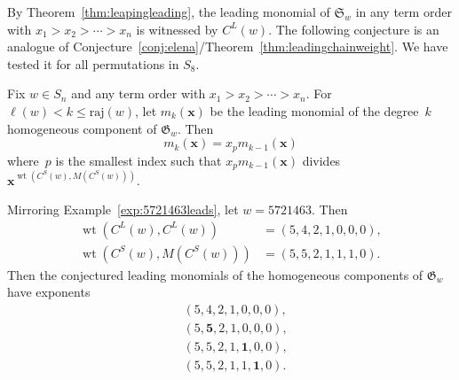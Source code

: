 \documentclass[ALCO]{cedram}
\newcommand{\absrajcode}[1]{\mathrm{raj}(#1)}
\DeclareMathOperator{\wt}{\mathrm{wt}}
\newcommand{\CL}{C^L}
\newcommand{\CS}{C^S}
\begin{document}
By Theorem~\ref{thm:leapingleading}, the leading monomial of $\mathfrak{S}_w$ in any term order with $x_1>x_2>\cdots>x_n$ is witnessed by $\CL(w)$. The following conjecture is an analogue of Conjecture~\ref{conj:elena}/Theorem~\ref{thm:leadingchainweight}. We have tested it for all permutations in $S_8$.
\begin{conjecture}
	\label{conj:reverseinterpolating}
	Fix $w\in S_n$ and any term order with $x_1>x_2>\cdots>x_n$. For $\ell(w)< k\leq \absrajcode{w}$, let $m_k(\bm{x})$ be the leading monomial of the degree~$k$ homogeneous component of $\mathfrak{G}_w$. Then
	\[m_k(\bm{x}) = x_pm_{k-1}(\bm{x}) \]
	where~$p$ is the smallest index such that $x_p m_{k-1}(\bm{x})$ divides $\bm{x}^{\wt(\CS(w),M(\CS(w)))}$.
\end{conjecture}

\begin{example}
	Mirroring Example~\ref{exp:5721463leads}, let $w=5721463$. Then
	\begin{align*}
		\wt(\CL(w),\CL(w)) &= (5, 4, 2, 1, 0, 0, 0),\\
		\wt(\CS(w),M(\CS(w))) &= (5, 5, 2, 1, 1, 1, 0).
	\end{align*}
	Then the conjectured leading monomials of the homogeneous components of $\mathfrak{G}_w$ have exponents
	\begin{align*}
		&(5, 4, 2, 1, 0, 0, 0),\\
		&(5, \textbf{5}, 2, 1, 0, 0, 0),\\
		&(5, 5, 2, 1, \textbf{1}, 0, 0),\\
		&(5, 5, 2, 1, 1, \textbf{1}, 0).
	\end{align*}
\end{example}



 




\end{document}
